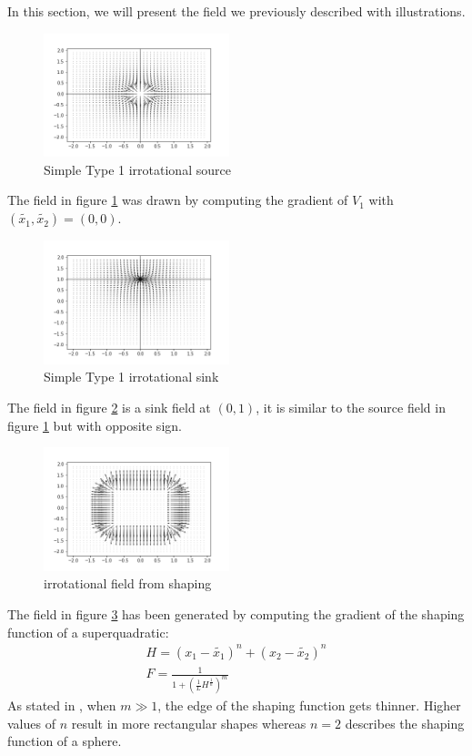 In this section, we will present the field we previously described with illustrations. 
\begin{figure}[h!]
    \centering
    \includegraphics[width=0.48\textwidth]{Images/simplesource.png}
    \caption{Simple Type 1 irrotational source}
    \label{fig:simplesource}
\end{figure}
The field in figure \ref{fig:simplesource} was drawn by computing the gradient of $V_1$ with $(\tilde{{x}_{1}}, \tilde{{x}_{2}}) = (0,0)$.

\begin{figure}[h!]
    \centering
    \includegraphics[width=0.48\textwidth]{Images/simplesink01.png}
    \caption{Simple Type 1 irrotational sink}
    \label{fig:simplesink}
\end{figure}
The field in figure \ref{fig:simplesink} is a sink field at $(0,1)$, it is similar to the source field in figure \ref{fig:simplesource} but with opposite sign.

\begin{figure}[h!]
    \centering
    \includegraphics[width=0.48\textwidth]{Images/irrotafromshaping.png}
    \caption{irrotational field from shaping}
    \label{fig:irrotafromshaping}
\end{figure}
The field in figure \ref{fig:irrotafromshaping} has been generated by computing the gradient of the shaping function of a superquadratic: 
\begin{align}
    H=(x_1-\tilde{{x}_{1}})^n+(x_2-\tilde{{x}_{2}})^n \\
    F=\frac{1}{1+(\frac{1}{L}H^{\frac{1}{n}})^m}
\end{align}
As stated in \cite{mcinnes2003velocity}, when $m\gg1$, the edge of the shaping function gets thinner. Higher values of $n$ result in more rectangular shapes whereas $n=2$ describes the shaping function of a sphere.

